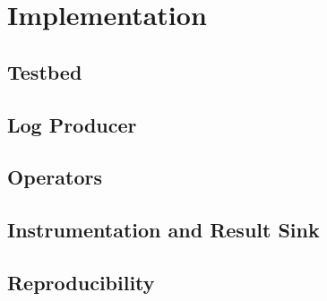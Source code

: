 \chapter{Implementation}\label{ch:impl}

\section{Testbed}
\section{Log Producer}
\section{Operators}
\section{Instrumentation and Result Sink}
\section{Reproducibility}
